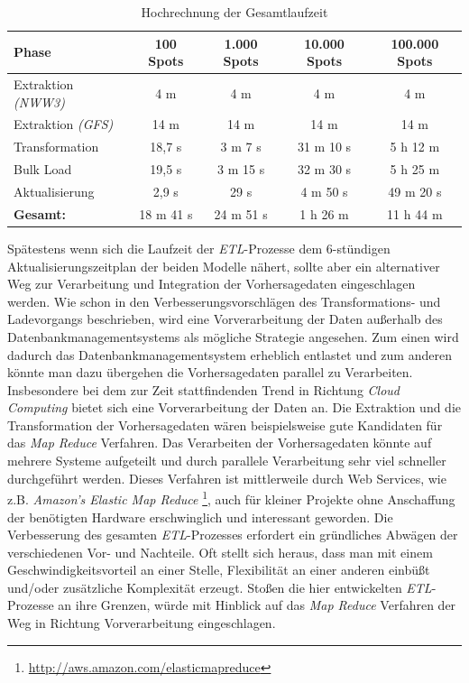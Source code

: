 \begin{table}[t]
  \centering
  {\sf
    \footnotesize
    \begin{longtable}{l|c|c|c|c}
      \toprule
      \textbf{Phase} & \textbf{100 Spots} & \textbf{1.000 Spots} & \textbf{10.000 Spots} & \textbf{100.000 Spots}\\
      \midrule
      Extraktion \textit{(NWW3)} & 4 m & 4 m & 4 m & 4 m \\
      Extraktion \textit{(GFS)} & 14 m & 14 m & 14 m & 14 m \\
      \midrule
      Transformation & 18,7 s & 3 m 7 s & 31 m 10 s & 5 h 12 m \\
      \midrule
      Bulk Load & 19,5 s & 3 m 15 s & 32 m 30 s & 5 h 25 m \\
      Aktualisierung & 2,9 s & 29 s & 4 m 50 s &  49 m 20 s \\
      \bottomrule
      \textbf{Gesamt:} & 18 m 41 s & 24 m 51 s & 1 h 26 m & 11 h 44 m \\
      \bottomrule
    \end{longtable}
  }
  \caption{Hochrechnung der Gesamtlaufzeit}
  \label{tab:gesamt_laufzeit}
\end{table}

Spätestens wenn sich die Laufzeit der \textit{ETL}-Prozesse dem
6-stündigen Aktualisierungszeitplan der beiden Modelle nähert, sollte
aber ein alternativer Weg zur Verarbeitung und Integration der
Vorhersagedaten eingeschlagen werden. Wie schon in den
Verbesserungsvorschlägen des Transformations- und Ladevorgangs
beschrieben, wird eine Vorverarbeitung der Daten außerhalb des
Datenbankmanagementsystems als mögliche Strategie angesehen. Zum einen
wird dadurch das Datenbankmanagementsystem erheblich entlastet und zum
anderen könnte man dazu übergehen die Vorhersagedaten parallel zu
Verarbeiten. Insbesondere bei dem zur Zeit stattfindenden Trend in
Richtung \textit{Cloud Computing} bietet sich eine Vorverarbeitung der
Daten an. Die Extraktion und die Transformation der Vorhersagedaten
wären beispielsweise gute Kandidaten für das \textit{Map Reduce}
Verfahren. Das Verarbeiten der Vorhersagedaten könnte auf mehrere
Systeme aufgeteilt und durch parallele Verarbeitung sehr viel
schneller durchgeführt werden.  Dieses Verfahren ist mittlerweile
durch Web Services, wie z.B. \textit{Amazon's Elastic Map Reduce}
\footnote{\url{http://aws.amazon.com/elasticmapreduce}}, auch für
kleiner Projekte ohne Anschaffung der benötigten Hardware
erschwinglich und interessant geworden. Die Verbesserung des gesamten
\textit{ETL}-Prozesses erfordert ein gründliches Abwägen der
verschiedenen Vor- und Nachteile. Oft stellt sich heraus, dass man mit
einem Geschwindigkeitsvorteil an einer Stelle, Flexibilität an einer
anderen einbüßt und/oder zusätzliche Komplexität erzeugt. Stoßen die
hier entwickelten \textit{ETL}-Prozesse an ihre Grenzen, würde mit
Hinblick auf das \textit{Map Reduce} Verfahren der Weg in Richtung
Vorverarbeitung eingeschlagen.

